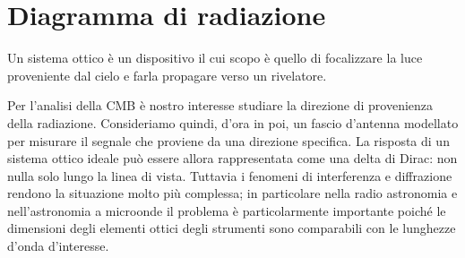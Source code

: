 \documentclass[12pt,a4paper,final]{book}
\begin{document}
\section{Diagramma di radiazione}\label{rad_pattern}
Un sistema ottico è un dispositivo il cui scopo è quello di focalizzare la luce proveniente dal cielo e farla propagare verso un rivelatore.


Per l'analisi della CMB è nostro interesse studiare la direzione di provenienza della radiazione. Consideriamo quindi, d'ora in poi, un fascio d'antenna modellato per misurare il segnale che proviene da una direzione specifica.
La risposta di un sistema ottico ideale può essere allora rappresentata come una delta di Dirac: non nulla solo lungo la linea di vista.
Tuttavia i fenomeni di interferenza e diffrazione rendono la situazione molto più complessa; in particolare nella radio astronomia e nell'astronomia a microonde il problema è particolarmente importante poiché le dimensioni degli elementi ottici degli strumenti sono comparabili con le lunghezze d'onda d'interesse.
\end{document}
